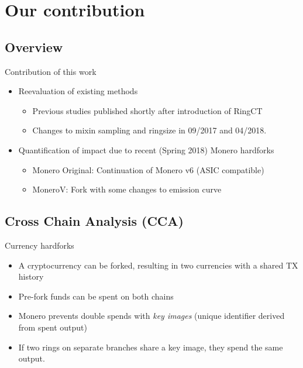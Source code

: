 \section{Our contribution}
\subsection{Overview}
\begin{frame}{Contribution of this work}
	\begin{itemize}
		\item Reevaluation of existing methods
		\begin{itemize}
			\item Previous studies published shortly after introduction of RingCT
			\item Changes to mixin sampling and ringsize in 09/2017 and 04/2018.
		\end{itemize}
		\item Quantification of impact due to recent (Spring 2018) Monero hardforks
		\begin{itemize}
			\item Monero Original: Continuation of Monero v6 (ASIC compatible)
			\item MoneroV: Fork with some changes to emission curve
		\end{itemize}
	\end{itemize}
\end{frame}

\subsection{Cross Chain Analysis (CCA)}
\begin{frame}{Currency hardforks}
	\begin{itemize}
		\item A cryptocurrency can be forked, resulting in two currencies with a shared TX history
		\begin{center}
			
		\end{center}
		\item Pre-fork funds can be spent on both chains
		\item Monero prevents double spends with \emph{key images} (unique identifier derived from spent output)
		\item<2-> If two rings on separate branches share a key image, they spend the same output.
	\end{itemize}
\end{frame}

